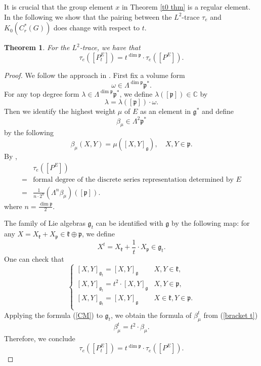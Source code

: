 \documentclass{amsproc}
\newtheorem{theorem}{Theorem}[section]
\theoremstyle{definition}
\theoremstyle{remark}
\numberwithin{equation}{section}
\newcommand{\kg}{\mathfrak{g}}
\newcommand{\kk}{\mathfrak{k}}
\newcommand{\kp}{\mathfrak{p}}
\begin{document}
It is crucial that the group element $x$ in Theorem \ref{t0 thm} is a regular element. In the following we show that the pairing between the $L^2$-trace $\tau_e$ and $K_0(C^*_r(G))$ does change with respect to $t$. 

\begin{theorem}\label{thm:L2}
For the $L^2$-trace, we have that 
\[
\tau_e \left([P^E_t]\right) = t^{\dim \kp}\cdot \tau_e \left([P^E]\right). 
\]	
\end{theorem}
\begin{proof}
We follow the approach in \cite{CM}. First fix a volume form 
\[
\omega \in \Lambda^{\dim \kp} \kp^*.
\]
For any top degree form $\lambda \in \Lambda^{\dim \kp} \kp^* $, we define $\lambda([\kp])\in \mathbb{C}$ by
\[
\lambda = \lambda([\kp]) \cdot \omega. 
\] 
Then we identify the highest weight $\mu$ of $E$ as an element in $\kg^*$ and define 
\[
\beta_\mu \in \Lambda^2 \kp^*
\] 
by the following
\[
\beta_\mu(X, Y) = \mu\left([X, Y]_\kg\right), \quad X, Y \in \kp. 
\] 
By \cite[Proposition 7.1 A]{CM}, 
\begin{equation}
\label{CM}
\begin{aligned}
&\tau_e \left([P^E]\right) \\
=& \text{formal degree of the discrete series representation determined by $E$}\\
=&\frac{1}{n\cdot 2^n} \left(\Lambda^n \beta_\mu\right)\left([\kp]\right). 
\end{aligned}
\end{equation}
where $n = \frac{\dim \kp}{2}$. 

The family of Lie algebras $\kg_t$ can be identified with $\kg$ by the following map: for any $X = X_\kk + X_\kp \in \kk \oplus \kp$, we define 
\[
X^t = X_\kk + \frac{1}{t}\cdot X_\kp \in \kg_t. 
\]
One can check that 
\begin{equation}
\label{bracket t}
\begin{cases}
[X, Y]_{\kg_t} = 	[X, Y]_\kg & X, Y \in \kk,\\
[X, Y]_{\kg_t} = 	t^2 \cdot [X, Y]_\kg & X, Y \in \kp,\\
[X, Y]_{\kg_t} = 	[X, Y]_\kg & X \in \kk, Y \in \kp. \\
\end{cases}
\end{equation}
Applying the formula (\ref{CM}) to $\kg_t$, we obtain the formula of $\beta^t_\mu$ from (\ref{bracket t}) 
\[
\beta_\mu^t = t^2 \cdot \beta_\mu.  
\]
Therefore, we conclude
\[
\tau_e \left([P^E_t]\right) = t^{\dim \kp}\cdot \tau_e \left([P^E]\right). 
\]
\end{proof}
\end{document}
